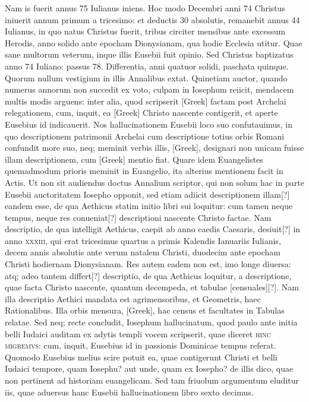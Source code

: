 Nam is fuerit annus 75 Iulianus iniens.
Hoc modo Decembri anni 74 Christus iniuerit annum primum a tricesimo: et
deductis 30 absolutis, remanebit annus 44 Iulianus, in quo natus
Christus fuerit, tribus circiter mensibus ante excessum Herodis, anno
solido ante epocham Dionysianam, qua hodie Ecclesia utitur.
Quae sane multorum veterum, inque illis Eusebii fuit opinio.
Sed
Christus baptizatus anno 74 Iuliano: passus 78.
Differentia, anni
quatuor solidi, paschata quinque.
Quorum nullum vestigium in illis
Annalibus extat.
Quinetiam auctor, quando numerus annorum
non succedit ex voto, culpam in Iosephum reiicit, mendacem multis
modis arguens: inter alia, quod scripserit \textgreek{[Greek]} factam post
Archelai relegationem, cum, inquit, ea \textgreek{[Greek]} Christo nascente
contigerit, et aperte Eusebius id indicauerit.
Nos hallucinationem
Eusebii loco suo confutauimus, in quo descriptionem patrimonii
Archelai cum descriptione totius orbis Romani confundit more
suo, neq; meminit verbis illis, \textgreek{[Greek]}, designari non
unicam fuisse illam descriptionem, cum \textgreek{[Greek]} mentio fiat.
Quare
idem Euangelistes quemadmodum prioris meminit in Euangelio,
ita alterius mentionem facit in Actis.
Ut non sit audiendus doctus Annalium
scriptor, qui non solum hac in parte Eusebii auctoritatem
Iosepho opponit, sed etiam adiicit descriptionem illam[?] eandem esse,
de qua Aethicus statim initio libri sui loquitur: cum tamen neque
tempus, neque res conueniat[?] descriptioni nascente Christo factae.
Nam descriptio, de qua intelligit Aethicus, caepit ab anno caedis
Caesaris, desiuit[?] in anno \textsc{xxxiii},
 qui erat tricesimus quartus a primis
Kalendis Ianuariis Iulianis, decem annis absolutis ante verum
natalem Christi, duodecim ante epocham Christi hodiernam Dionysianam.
Res autem eadem non est, imo longe diuersa: atq; adeo
tantem differt[?] descriptio, de qua Aethicus loquitur, a descriptione,
quae facta Christo nascente, quantum decempeda, et tabulae [censuales][?].
Nam illa descriptio Aethici mandata est agrimensoribus, et
Geometris, haec Rationalibus.
Illa orbis mensura, \textgreek{[Greek]},
hac census et facultates in Tabulas relatae.
Sed neq; recte concludit,
Iosephum hallucinatum, quod paulo ante initia belli Iudaici
auditam ex adytis templi vocem scripserit, quae diceret \textsc{hinc
migremvs}: cum, inquit, Eusebius id in passionis Dominicae tempus
referat.
Quomodo Eusebius melius scire potuit ea, quae contigerunt
Christi et belli Iudaici tempore, quam Iosephu? aut unde,
quam ex Iosepho? de illis dico, quae non pertinent ad historiam euangelicam.
{}
Sed tam friuolum argumentum eluditur iis, quae aduersus
hanc Eusebii hallucinationem libro sexto decimus.

